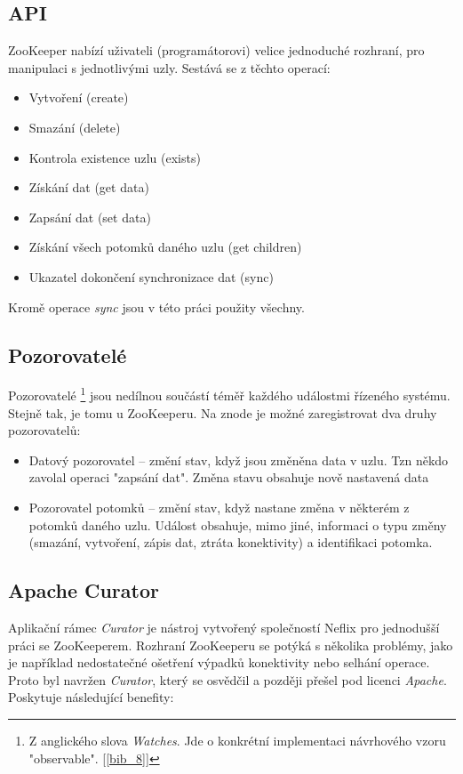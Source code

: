 \documentclass[
  digital, %
  table,   %
  nolof,     %
  nolot,     %
  twoside, %
  nocover,
  monochrome,
  12pt
]{fithesis3}
\begin{document}
\subsection*{API}
ZooKeeper nabízí uživateli (programátorovi) velice jednoduché rozhraní, pro manipulaci s jednotlivými uzly. Sestává se z těchto operací:
\begin{itemize}
  \item Vytvoření (create)
  \item Smazání (delete)
  \item Kontrola existence uzlu (exists)
  \item Získání dat (get data)
  \item Zapsání dat (set data)
  \item Získání všech potomků daného uzlu (get children)
  \item Ukazatel dokončení synchronizace dat (sync)
\end{itemize}

Kromě operace \textit{sync} jsou v této práci použity všechny.

\subsection*{Pozorovatelé}
Pozorovatelé \footnote{Z anglického slova \textit{Watches}. Jde o konkrétní implementaci návrhového vzoru "observable". [\ref{bib_8}]} jsou nedílnou součástí téměř každého událostmi řízeného systému. Stejně tak, je tomu u ZooKeeperu. Na znode je možné zaregistrovat dva druhy pozorovatelů:

\begin{itemize}
  \item Datový pozorovatel -- změní stav, když jsou změněna data v uzlu. Tzn někdo zavolal operaci "zapsání dat". Změna stavu obsahuje nově nastavená data
  \item Pozorovatel potomků -- změní stav, když nastane změna v některém z potomků daného uzlu. Událost obsahuje, mimo jiné, informaci o typu změny (smazání, vytvoření, zápis dat, ztráta konektivity) a identifikaci potomka. 
\end{itemize}

\subsection*{Apache Curator}
Aplikační rámec \textit{Curator}	je nástroj vytvořený společností Neflix pro jednodušší práci se ZooKeeperem. Rozhraní ZooKeeperu se potýká s několika problémy, jako je například nedostatečné ošetření výpadků konektivity nebo selhání operace. Proto byl navržen \textit{Curator}, který se osvědčil a později přešel pod licenci \textit{Apache}. Poskytuje následující benefity:
\end{document}
